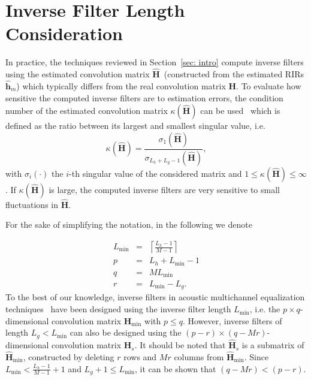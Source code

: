 \documentclass{article}
\begin{document}
\section{Inverse Filter Length Consideration}
\label{sec: mathlength}
\vspace{-0.2cm}

In practice, the techniques reviewed in Section~\ref{sec: intro} compute inverse filters using the estimated convolution matrix $\hat{\mathbf{H}}$~(constructed from the estimated RIRs $\hat{\mathbf{h}}_m$) which typically differs from the real convolution matrix $\mathbf{H}$.
To evaluate how sensitive the computed inverse filters are to estimation errors, the condition number of the estimated convolution matrix $\kappa(\hat{\mathbf{H}})$ can be used~\cite{Golub_Matrix_book} which is defined as the ratio between its largest and smallest singular value, i.e. 
\begin{equation}
\kappa(\hat{\mathbf{H}}) = \frac{\sigma_1(\hat{\mathbf{H}})}{\sigma_{L_h+L_g-1}(\hat{\mathbf{H}})},
\end{equation}
with $\sigma_i(\cdot)$ the $i$-th singular value of the considered matrix and $1 \leq \kappa(\hat{\mathbf{H}}) \leq \infty$. 
If $\kappa({\hat{\mathbf{H}}})$ is large, the computed inverse filters are very sensitive to small fluctuations in $\hat{\mathbf{H}}$.

For the sake of simplifying the notation, in the following we denote

\begin{eqnarray}
  L_{\min} &=& \left\lceil\frac{L_h-1}{M-1} \right\rceil \\ 
  p & = & L_h + L_{\min} -1 \\
  q &=& M L_{\min} \\
  r &=& L_{\min} - L_g.
\end{eqnarray}
To the best of our knowledge, inverse filters in acoustic multichannel equalization techniques~\cite{Miyoshi_ITASS_1988, Kodrasi_ICASSP_2012, Zhang_IWAENC_2010} have been designed using the inverse filter length $L_{\min}$, i.e. the $p \times q$-dimensional convolution matrix $\hat{\mathbf{H}}_{\min}$ with  $p \leq q$.
However, inverse filters of length $L_g < L_{\min}$ can also be designed using the $(p-r) \times (q-Mr)$-dimensional convolution matrix $\hat{\mathbf{H}}_{s}$.
It should be noted that $\hat{\mathbf{H}}_s$ is a submatrix of $\hat{\mathbf{H}}_{\min}$, constructed by deleting $r$ rows and $Mr$ columns from $\hat{\mathbf{H}}_{\min}$. 
Since $L_{\min} < \frac{L_h-1}{M-1} + 1$ and $L_g +1 \leq L_{\min}$, it can be shown that $(q-Mr) < (p - r)$.
\end{document}
